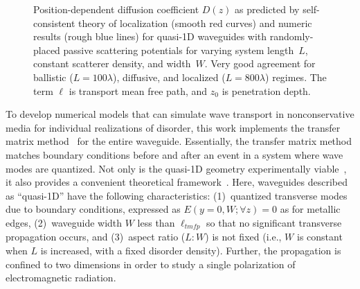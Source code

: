 \begin{figure}
\vskip -0.5cm
\centerline{
}
\vskip -0.5cm
\caption[Position-dependent diffusion coefficient~$D(z)$ as predicted by self- consistent theory of localization (smooth red curves) and numeric results (rough blue lines) for quasi-1D waveguides with randomly-placed passive scattering potentials for varying system length~$L$, constant scatterer density, and width~$W$.]{Position-dependent diffusion coefficient $D(z)$ as predicted by self-consistent theory of localization (smooth red curves) and numeric results (rough blue lines) for quasi-1D waveguides with randomly-placed passive scattering potentials for varying system length~$L$, constant scatterer density, and width~$W$. Very good agreement for ballistic ($L=100 \lambda$), diffusive, and localized ($L=800 \lambda$) regimes. The term $\ell$ is transport mean free path, and $z_0$ is penetration depth.}
\label{fig:Dz_passive}
\end{figure}

To develop numerical models that can simulate wave transport in nonconservative media for individual realizations of disorder, this work implements the transfer matrix method~\cite{1981_MacKinnon_scaling,1992_Pendry,2003_Kettemann} 
for the entire waveguide. Essentially, the transfer matrix method matches boundary conditions before and after an event in a system where wave modes are quantized. Not only is the quasi-1D geometry experimentally viable~\cite{2009_Genack_PRB}, it also provides a convenient theoretical framework~\cite{1982_Dorokhov_DMPK,1988_Mello_Kumar_DMPK}. Here, waveguides described as ``quasi-1D'' have the following characteristics: (1)~quantized transverse modes due to boundary conditions, expressed as $E(y=0,W;\forall z)=0$ as for metallic edges, (2)~waveguide width $W$ less than $\ell_{tmfp}$ so that no significant transverse propagation occurs, and (3)~aspect ratio ($L:W$) is not fixed (i.e., $W$ is constant when $L$ is increased, with a fixed disorder density). Further, the propagation is confined to two dimensions in order to study a single polarization of electromagnetic radiation.

